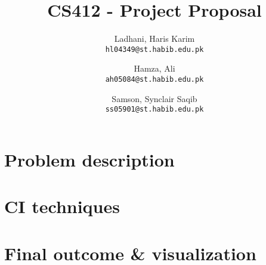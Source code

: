 \documentclass[11pt,letterpaper]{article}
\newcommand{\blue}[1]{\textcolor{RoyalBlue}{#1}}
\newcommand{\fillme}[1]{\blue{\texttt{[Insert #1]}}}
\newcommand{\instructions}[1]{\blue{\textit{#1}}}
\renewcommand{\instructions}[1]{}
\renewcommand{\fillme}[1]{}
\begin{document}
\title{CS412 - Project Proposal \fillme{Your Project}}
\author{Ladhani, Haris Karim\\
\texttt{hl04349@st.habib.edu.pk}
\and
Hamza, Ali\\
\texttt{ah05084@st.habib.edu.pk}
\and
Samson, Synclair Saqib\\
\texttt{ss05901@st.habib.edu.pk}
}
\maketitle



\instructions{If you are taking CS446 for 4 hours credit, you need to
  do a research project.\\
This is a \LaTeX template for the initial proposal,  but should also give you a start on the final report.\\
The blue pieces of text  in this template are either instructions ({\tt$\backslash$instructions\{...\}}) or indicate where you need to fill in something ({\tt$\backslash$fillme\{...\}}).  
You should replace all the {\tt$\backslash$fillme\{...\}} commands with your own text.
To make the instructions disappear, please uncomment the 
\begin{center}
{\tt$\backslash$renewcommand\{$\backslash$instructions\}[1]\{\}}\\
\end{center}
lines in the preamble (just above  {\tt $\backslash$begin\{document\}} of this .tex file) by removing the leading \% marks, 
recompile (run \LaTeX again) and submit the PDF on Compass.\\
The template for the final report is at
\url{http://courses.engr.illinois.edu/cs446/Projects/CS446proj.tex}
(or
\url{http://courses.engr.illinois.edu/cs446/Projects/CS446proj.pdf}
for the pdf)
}
\section*{Problem description}
\instructions{Describe the task you want to tackle in your project.}

\section*{CI techniques}
\instructions{Has there been any prior work on this task? If so,
  provide references where available}

\section*{Final outcome \& visualization}
\instructions{Do you have data to train and test your system on? How
  will you evaluate your system?}
\end{document}

